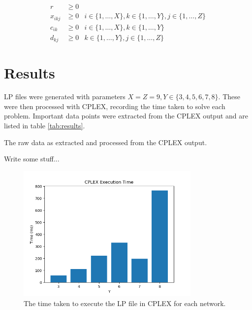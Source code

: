 \documentclass[12pt]{article} %
\begin{document}
\begin{align}
\label{eq:obj_function_nn}
r &\geq 0 \\[1em]
\label{eq:decision_var_nn}
x_{ikj} &\geq 0 & i \in \{1, \ldots, X\}, k \in \{1, \ldots, Y\}, j \in \{1, \ldots, Z\} \\[1em]
\label{eq:source_capacity_nn}
c_{ik} &\geq 0 & i \in \{1, \ldots, X\}, k \in \{1, \ldots, Y\} \\[1em]
\label{eq:dest_capacity_nn}
d_{kj} &\geq 0 & k \in \{1, \ldots, Y\}, j \in \{1, \ldots, Z\}
\end{align}

\section{Results}

LP files were generated with parameters $X = Z = 9, Y \in \{3, 4, 5, 6, 7, 8\}$. These were then processed with CPLEX, recording the time taken to solve each problem. Important data points were extracted from the CPLEX output and are listed in table \ref{tab:results}.

\begin{table}[H]
	\centering
	\caption{The raw data as extracted and processed from the CPLEX output.}
	\label{tab:results}
\end{table}

\noindent Write some stuff...

\begin{figure}[H]
	\centering
	\includegraphics[width=0.8\textwidth]{cplex_data_time}
	\caption{The time taken to execute the LP file in CPLEX for each network.}
	\label{fig:cplex_time}
\end{figure}
\end{document}
